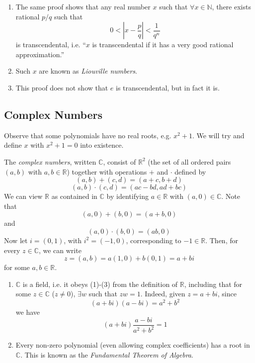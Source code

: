 \documentclass[10pt, a4paper, twoside]{report}
\begin{document}
\begin{remark} \item[]
    \begin{enumerate}
        \item The same proof shows that any real number \(x\) such that \(\forall x\in\mathbb{N}\), there exists rational \(p/q\) such that 
        \[0<\left|x-\frac pq\right|<\frac 1{q^n}\]
        is transcendental, i.e. ``\(x\) is transcendental if it has a very good rational approximation.''
        \item Such \(x\) are known as \emph{Liouville numbers}.
        \item This proof does not show that \(e\) is transcendental, but in fact it is.
    \end{enumerate}
\end{remark}
\subsection{Complex Numbers}
Observe that some polynomials have no real roots, e.g. \(x^2+1\). We will try and define \(x\) with \(x^2+1=0\) into existence.

The \emph{complex numbers}, written \(\mathbb{C}\), consist of \(\mathbb{R}^2\) (the set of all ordered pairs \((a,b)\) with \(a,b\in\mathbb{R}\)) together with operations \(+\) and \(\cdot\) defined by 
\[(a,b)+(c,d)=(a+c,b+d)\]
\[(a,b)\cdot(c,d)=(ac-bd,ad+bc)\]
We can view \(\mathbb{R}\) as contained in \(\mathbb{C}\) by identifying \(a\in\mathbb{R}\) with \((a,0)\in\mathbb{C}\). Note that 
\[(a,0)+(b,0)=(a+b,0)\]
and
\[(a,0)\cdot(b,0)=(ab,0)\]
Now let \(i=(0,1)\), with \(i^2=(-1,0)\), corresponding to \(-1\in\mathbb{R}\). Then, for every \(z\in\mathbb{C}\), we can write 
\[z=(a,b)=a(1,0)+b(0,1)=a+bi\]
for some \(a,b\in\mathbb{R}\).
\begin{remark} \item[]
    \begin{enumerate}
        \item \(\mathbb{C}\) is a field, i.e. it obeys (1)-(3) from the definition of \(\mathbb{R}\), including that for some \(z\in\mathbb{C}\) (\(z\neq 0\)), \(\exists w\) such that \(zw=1\). Indeed, given \(z=a+bi\), since 
        \[(a+bi)(a-bi)=a^2+b^2\]
        we have
        \[(a+bi)\frac{a-bi}{a^2+b^2}=1\]
        \item Every non-zero polynomial (even allowing complex coefficients) has a root in \(\mathbb{C}\). This is known as the \emph{Fundamental Theorem of Algebra}.
    \end{enumerate}
\end{remark}
\end{document}
